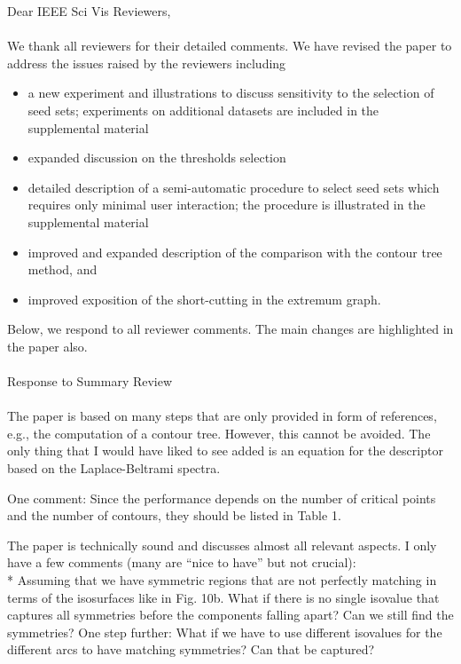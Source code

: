 \documentclass[10pt]{article}
\title{}
\date{}
\begin{document}
\noindent Dear IEEE Sci Vis Reviewers,\\\\

We thank all reviewers for their detailed comments. We have revised the paper to address the issues raised by the reviewers including 
\begin{itemize}
\item a new experiment and illustrations to discuss sensitivity to the selection of seed sets;	experiments 
	on additional datasets are included in the supplemental material
\item expanded discussion on the thresholds selection
\item detailed description of a semi-automatic procedure to select seed sets which requires only minimal 
	user interaction; the procedure is illustrated in the supplemental material
\item improved and expanded description of the comparison with the contour tree method, and
\item improved exposition of the short-cutting in the extremum graph.
\end{itemize} 
Below, we respond to all reviewer comments. The main changes are highlighted in the paper also.\\\\

{\noindent \LARGE Response to Summary Review}\\\\

The paper is based on many steps that are only provided in form of
   references, e.g., the computation of a contour tree. However, this cannot
   be avoided. The only thing that I would have liked to see added is an
   equation for the descriptor based on the Laplace-Beltrami spectra.

   One comment:
   Since the performance depends on the number of critical points and the
   number of contours, they should be listed in Table 1.

   The paper is technically sound and discusses almost all relevant aspects.
   I only have a few comments (many are ``nice to have'' but not crucial):\\
   * Assuming that we have symmetric regions that are not perfectly matching
   in terms of the isosurfaces like in Fig. 10b. What if there is no single
   isovalue that captures all symmetries before the components falling
   apart? Can we still find the symmetries? One step further: What if we
   have to use different isovalues for the different arcs to have matching
   symmetries? Can that be captured?\\
   
\end{document}
